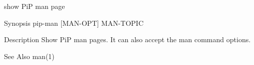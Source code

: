 show Pi\-P man page

\begin{DoxyParagraph}{Synopsis}
pip-\/man \mbox{[}M\-A\-N-\/\-O\-P\-T\mbox{]} M\-A\-N-\/\-T\-O\-P\-I\-C
\end{DoxyParagraph}
\begin{DoxyParagraph}{Description}
Show Pi\-P man pages. It can also accept the man command options.
\end{DoxyParagraph}
\begin{DoxySeeAlso}{See Also}
man(1) 
\end{DoxySeeAlso}
